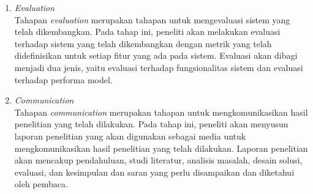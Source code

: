 \begin{enumerate}
	\item \emph{Evaluation}~\\
	      Tahapan \emph{evaluation} merupakan tahapan untuk mengevaluasi sistem yang telah dikembangkan. Pada tahap ini, peneliti akan melakukan evaluasi terhadap sistem yang telah dikembangkan dengan metrik yang telah didefinisikan untuk setiap fitur yang ada pada sistem. Evaluasi akan dibagi menjadi dua jenis, yaitu evaluasi terhadap fungsionalitas sistem dan evaluasi terhadap performa model.
	\item \emph{Communication}~\\
	      Tahapan \emph{communication} merupakan tahapan untuk mengkomunikasikan hasil penelitian yang telah dilakukan. Pada tahap ini, peneliti akan menyusun laporan penelitian yang akan digunakan sebagai media untuk mengkomunikasikan hasil penelitian yang telah dilakukan. Laporan penelitian akan mencakup pendahuluan, studi literatur, analisis masalah, desain solusi, evaluasi, dan kesimpulan dan saran yang perlu disampaikan dan diketahui oleh pembaca.
\end{enumerate}
